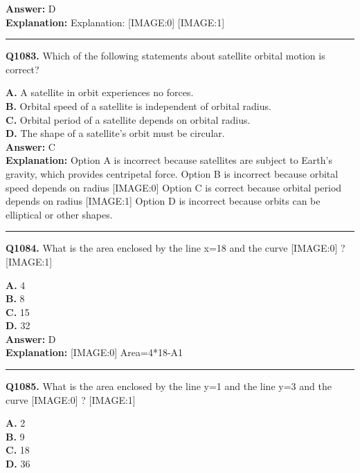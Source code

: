 \documentclass[12pt]{article}
\begin{document}
\textbf{Answer:} D \\
\textbf{Explanation:} Explanation:
[IMAGE:0]
[IMAGE:1]

\hrule
\vspace{1em}


\noindent
\textbf{Q1083.} Which of the following statements about satellite orbital motion is correct?



\textbf{A.} A satellite in orbit experiences no forces. \\
\textbf{B.} Orbital speed of a satellite is independent of orbital radius. \\
\textbf{C.} Orbital period of a satellite depends on orbital radius. \\
\textbf{D.} The shape of a satellite's orbit must be circular. \\

\textbf{Answer:} C \\
\textbf{Explanation:} Option A is incorrect because satellites are subject to Earth's gravity, which provides centripetal force. Option B is incorrect because orbital speed depends on radius
[IMAGE:0]
Option C is correct because orbital period depends on radius
[IMAGE:1]
Option D is incorrect because orbits can be elliptical or other shapes.

\hrule
\vspace{1em}


\noindent
\textbf{Q1084.} What is the area enclosed by the line x=18 and the curve
[IMAGE:0]
?
[IMAGE:1]



\textbf{A.} 4 \\
\textbf{B.} 8 \\
\textbf{C.} 15 \\
\textbf{D.} 32 \\

\textbf{Answer:} D \\
\textbf{Explanation:} [IMAGE:0]
Area=4*18-A1

\hrule
\vspace{1em}


\noindent
\textbf{Q1085.} What is the area enclosed by the line y=1 and the line y=3 and the curve
[IMAGE:0]
?
[IMAGE:1]



\textbf{A.} 2 \\
\textbf{B.} 9 \\
\textbf{C.} 18 \\
\textbf{D.} 36 \\
\end{document}
